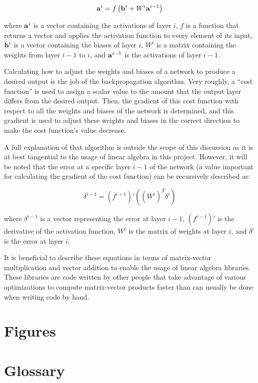 \documentclass[12pt]{article}
\newcommand{\bi}[1]{\mbox{\textbf{#1}}}
\begin{document}
\[
\bi{a}^i = f\left(\bi{b}^i + W^i\bi{a}^{i-1}\right)
\]

where $\bi{a}^i$ is a vector containing the activations of layer $i$, $f$ is a function that returns a vector and applies the activation function to every element of its input, $\bi{b}^i$ is a vector containing the biases of layer $i$, $W^i$ is a matrix containing the weights from layer $i - 1$ to $i$, and $\bi{a}^{i-1}$ is the activations of layer $i - 1$.

Calculating how to adjust the weights and biases of a network to produce a desired output is the job of the backpropagation algorithm.
Very roughly, a ``cost function'' is used to assign a scalar value to the amount that the output layer differs from the desired output.
Then, the gradient of this cost function with respect to all the weights and biases of the network is determined, and this gradient is used to adjust these weights and biases in the correct direction to make the cost function's value decrease.

A full explanation of that algorithm is outside the scope of this discussion as it is at best tangential to the usage of linear algebra in this project.
However, it will be noted that the error at a specific layer $i-1$ of the network (a value important for calculating the gradient of the cost function) can be recursively described as:

\[
\delta^{i-1} = (f^{i-1})'\left(\left(W^i\right)^T\delta^i\right)
\]

where $\delta^{i-1}$ is a vector representing the error at layer $i - 1$, $(f^{i-1})'$ is the derivative of the activation function, $W^i$ is the matrix of weights at layer $i$, and $\delta^i$ is the error at layer $i$.

\bigskip

It is beneficial to describe these equations in terms of matrix-vector multiplication and vector addition to enable the usage of linear algebra libraries.
These libraries are code written by other people that take advantage of various optimizations to compute matrix-vector products faster than can usually be done when writing code by hand.

\section{Figures}



\section{Glossary}
\end{document}

